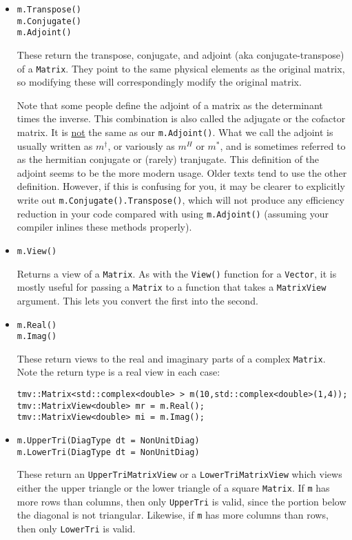 \documentclass[twoside,letterpaper,11pt]{article}
\renewcommand{\tt}[1]{{\texttt {#1}}}
\begin{document}
\begin{itemize}
\item
\begin{verbatim}
m.Transpose()
m.Conjugate()
m.Adjoint()
\end{verbatim}
These return the transpose, conjugate, and adjoint (aka conjugate-transpose) 
of a \tt{Matrix}.  They point to the 
same physical elements as the original matrix, so modifying these will
correspondingly modify the original matrix.

Note that some people define the adjoint of a matrix as the determinant times
the inverse.  This combination is also called the adjugate or the cofactor matrix.
It is \underline{not} the same as our \tt{m.Adjoint()}.  What we call the adjoint 
is usually written as $m^\dagger$, or variously as $m^H$ or $m^*$, 
and is sometimes referred to as the hermitian conjugate
or (rarely) tranjugate.  This definition of the adjoint seems to be the more modern
usage.  Older texts tend to use the other definition.  However, if this is confusing
for you, it may be clearer to explicitly write out \tt{m.Conjugate().Transpose()},
which will not produce any efficiency reduction in your code compared with using
\tt{m.Adjoint()} (assuming your compiler inlines these methods properly).

\item
\begin{verbatim}
m.View()
\end{verbatim}
Returns a view of a \tt{Matrix}.  As with the \tt{View()} function for a \tt{Vector}, it is mostly
useful for passing a \tt{Matrix} to a function that takes a \tt{MatrixView} argument.  
This lets you convert the first into the second.

\item
\begin{verbatim}
m.Real()
m.Imag()
\end{verbatim}
These return views to the real and imaginary parts of a complex \tt{Matrix}.
Note the return type is a real view in each case:
\begin{verbatim}
tmv::Matrix<std::complex<double> > m(10,std::complex<double>(1,4));
tmv::MatrixView<double> mr = m.Real();
tmv::MatrixView<double> mi = m.Imag();
\end{verbatim}

\item
\begin{verbatim}
m.UpperTri(DiagType dt = NonUnitDiag)
m.LowerTri(DiagType dt = NonUnitDiag)
\end{verbatim}
These return an \tt{UpperTriMatrixView} or a \tt{LowerTriMatrixView} which
views either the upper triangle or the lower triangle of a square \tt{Matrix}.
If \tt{m} has more rows than columns, then only \tt{UpperTri} is valid, since
the portion below the diagonal is not triangular.
Likewise, if \tt{m} has more columns than rows, then only \tt{LowerTri} is valid.


\end{itemize}
\end{document}
